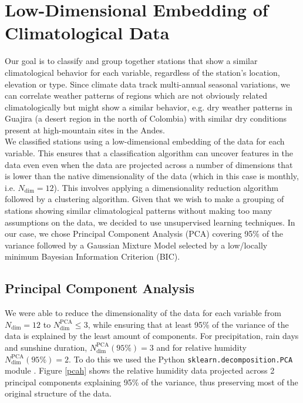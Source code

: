 \documentclass[12pt]{iopart}
\begin{document}
\section{Low-Dimensional Embedding of Climatological Data}

Our goal is to classify and group together stations that show a similar climatological behavior for each variable, regardless of the station's location, elevation or type. Since climate data track multi-annual seasonal variations, we can correlate weather patterns of regions which are not obviously related climatologically but might show a similar behavior, e.g. dry weather patterns in Guajira (a desert region in the north of Colombia) with similar dry conditions present at high-mountain sites in the Andes.\\

We classified stations using a low-dimensional embedding of the data \cite{embed} for each variable. This ensures that a classification algorithm can uncover features in the data even even when the data are projected across a number of dimensions that is lower than the native dimensionality of the data (which in this case is monthly, i.e. $N_\mathrm{dim}=12$). This involves applying a dimensionality reduction algorithm followed by a clustering algorithm. Given that we wish to make a grouping of stations showing similar climatological patterns without making too many assumptions on the data, we decided to use unsupervised learning techniques.  In our case, we chose Principal Component Analysis (PCA) covering 95\% of the variance followed by a Gaussian Mixture Model selected by a low/locally minimum Bayesian Information Criterion (BIC). 

\subsection{Principal Component Analysis}

We were able to reduce the dimensionality of the data for each variable from  $N_\mathrm{dim}=12$ to  $N_\mathrm{dim}^\mathrm{PCA}\le3$, while ensuring that at least 95\% of the variance of the data is explained by the least amount of components. For precipitation, rain days and sunshine duration, $N_\mathrm{dim}^\mathrm{PCA}(95\%)=3$ and for relative humidity $N_\mathrm{dim}^\mathrm{PCA}(95\%)=2$. To do this we used the Python \texttt{sklearn.decomposition.PCA} module \cite{sklearn}. Figure \ref{pcah} shows the relative humidity data projected across 2 principal components explaining 95\% of the variance, thus preserving most of the original structure of the data.
\end{document}
